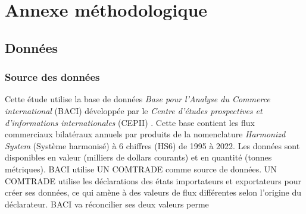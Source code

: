 \documentclass[french,10pt,a4paper]{article}
\begin{document}

\newpage

\section{Annexe méthodologique}
\subsection{Données}
\subsubsection{Source des données}
Cette étude utilise la base de données \textit{Base pour l'Analyse du Commerce international} (BACI) développée par le \textit{Centre d'études prospectives et d'informations internationales} (CEPII) \citep{Gaulier2010}. Cette base contient les flux commerciaux bilatéraux annuels par produits de la nomenclature \textit{Harmonizd System} (Système harmonisé) à 6 chiffres (HS6) de 1995 à 2022. Les données sont disponibles en valeur (milliers de dollars courants) et en quantité (tonnes métriques). BACI utilise UN COMTRADE comme source de données. UN COMTRADE utilise les déclarations des états importateurs et exportateurs pour créer ses données, ce qui amène à des valeurs de flux différentes selon l'origine du déclarateur. BACI va réconcilier ses deux valeurs perme



\newpage


\end{document}
